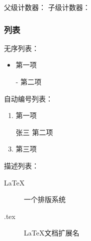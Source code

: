 \documentclass{ctexart}
\begin{document}
            父级计数器： %
            子级计数器： %

        \subsubsection{列表}
            无序列表：
            \begin{itemize}
                \item 第一项 
                \item [-] 第二项 
            \end{itemize}

            自动编号列表：
            \begin{enumerate}
                \item 第一项
                \item [张三] 第二项 
                \item 第三项
            \end{enumerate}

            描述列表：
            \begin{description}
                \item[LaTeX] 一个排版系统
                \item[.tex] LaTeX文档扩展名  
            \end{description}
\end{document}
